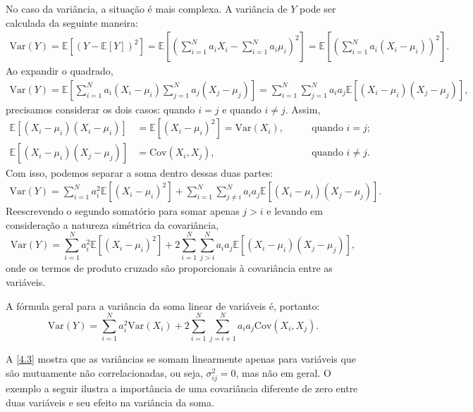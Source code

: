No caso da variância, a situação é mais complexa. A variância de $ Y $ pode ser calculada da seguinte maneira:
\begin{align*}
\text{Var}(Y) = \mathbb{E}[(Y - \mathbb{E}[Y])^2] = \mathbb{E}\left[\left(\sum_{i=1}^N a_i X_i - \sum_{i=1}^N a_i \mu_i \right)^2\right] = \mathbb{E}\left[\left(\sum_{i=1}^N a_i (X_i - \mu_i)\right)^2\right].
\end{align*}
Ao expandir o quadrado,
\begin{align*}
\text{Var}(Y) = \mathbb{E}\left[\sum_{i=1}^N a_i (X_i - \mu_i) \sum_{j=1}^N a_j (X_j - \mu_j)\right] = \sum_{i=1}^N \sum_{j=1}^N a_i a_j \mathbb{E}[(X_i - \mu_i)(X_j - \mu_j)],
\end{align*}
precisamos considerar os dois casos: quando $i = j$ e quando $i \neq j$. Assim,
\begin{align*}
\mathbb{E}[(X_i - \mu_i)(X_i - \mu_i)] &= \mathbb{E}[(X_i - \mu_i)^2] = \text{Var}(X_i), &\qquad \text{quando $i=j$}; \\
\mathbb{E}[(X_i - \mu_i)(X_j - \mu_j)] &= \text{Cov}(X_i, X_j), &\qquad \text{quando $i\neq j$}.
\end{align*}
Com isso, podemos separar a soma dentro dessas duas partes:
\begin{align*}
\text{Var}(Y) = \sum_{i=1}^N a_i^2 \mathbb{E}[(X_i - \mu_i)^2] + \sum_{i=1}^N \sum_{j \neq i}^N a_i a_j \mathbb{E}[(X_i - \mu_i)(X_j - \mu_j)].
\end{align*}
Reescrevendo o segundo somatório para somar apenas $j > i$ e levando em consideração a natureza simétrica da covariância,
\begin{equation*}
\text{Var}(Y) = \sum_{i=1}^{N} a_i^2 \mathbb{E}[(X_i - \mu_i)^2] + 2 \sum_{i=1}^{N} \sum_{j>i}^{N} a_i a_j \mathbb{E}[(X_i - \mu_i)(X_j - \mu_j)],
\end{equation*}
onde os termos de produto cruzado são proporcionais à covariância entre as variáveis. 

A fórmula geral para a variância da soma linear de variáveis é, portanto:
\begin{equation}\label{4.3}
\text{Var}(Y) = \sum_{i=1}^{N} a_i^2 \text{Var}(X_i) + 2 \sum_{i=1}^{N} \sum_{j=i+1}^{N} a_i a_j \text{Cov}(X_i, X_j).
\end{equation}

A \autoref{4.3} mostra que as variâncias se somam linearmente apenas para variáveis que são mutuamente não correlacionadas, ou seja, $ \sigma_{ij}^2 = 0 $, mas não em geral. O exemplo a seguir ilustra a importância de uma covariância diferente de zero entre duas variáveis e seu efeito na variância da soma.

